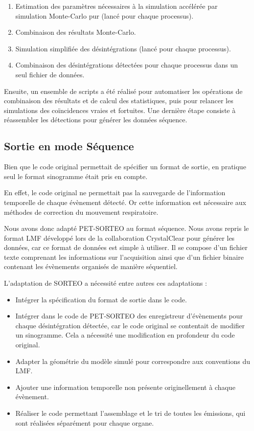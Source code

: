     \begin{enumerate}
        \item Estimation des paramètres nécessaires à la simulation accélérée par simulation Monte-Carlo pur (lancé pour chaque processus).
        \item Combinaison des résultats Monte-Carlo.
        \item Simulation simplifiée des désintégrations (lancé pour chaque processus).
        \item Combinaison des désintégrations détectées pour chaque processus dans un seul fichier de données.
    \end{enumerate}

Ensuite, un ensemble de scripts a été réalisé pour automatiser les opérations de combinaison des résultats et de calcul des statistiques, puis pour relancer les simulations des coïncidences vraies et fortuites. Une dernière étape consiste à réassembler les détections pour générer les données séquence.

\subsection{Sortie en mode Séquence}

Bien que le code original permettait de spécifier un format de sortie, en pratique seul le format sinogramme était pris en compte. 

En effet, le code original ne permettait pas la sauvegarde de l'information temporelle de chaque évènement détecté. Or cette information est nécessaire aux méthodes de correction du mouvement respiratoire. 

Nous avons donc adapté PET-SORTEO au format séquence. Nous avons repris le format LMF développé lors de la collaboration CrystalClear pour générer les données, car ce format de données est simple à utiliser. Il se compose d'un fichier texte comprenant les informations sur l'acquisition ainsi que d'un fichier binaire contenant les évènements organisés de manière séquentiel.

 L'adaptation de SORTEO a nécessité entre autres ces adaptations :

\begin{itemize}
\item Intégrer la spécification du format de sortie dans le code.
\item Intégrer dans le code de PET-SORTEO des enregistreur d'évènements pour chaque désintégration détectée, car le code original se contentait de modifier un sinogramme. Cela a nécessité une modification en profondeur du code original.
\item Adapter la géométrie du modèle simulé pour correspondre aux conventions du LMF.
\item Ajouter une information temporelle non présente originellement à chaque évènement.
\item Réaliser le code permettant l'assemblage et le tri de toutes les émissions, qui sont réalisées séparément pour chaque organe.
\end{itemize}


